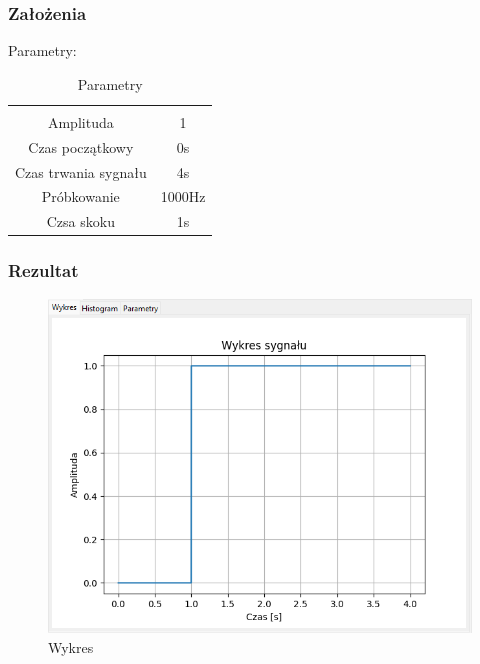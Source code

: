 \documentclass{article}
\begin{document}
\subsubsection{Założenia}
\noindent
Parametry:
\begin{table}[h!]
    \centering
    \vspace{0.2cm}
    \begin{tabular}{|c|c|}
        \hline\hline\\[-0.4cm]
        Amplituda & 1  \\
        \hline
        Czas początkowy & 0s  \\
        \hline
        Czas trwania sygnału & 4s  \\
        \hline
        Próbkowanie & 1000Hz \\
        \hline
        Czsa skoku & 1s\\
        \hline
    \end{tabular}
    \caption{Parametry}
    \label{skokjednostowy}
\end{table}
\subsubsection{Rezultat}
\begin{figure}[h!]
    \centering
    \includegraphics[width=\textwidth]{img/skok/wykres.png}
    \caption{Wykres}
\end{figure}
\end{document}
